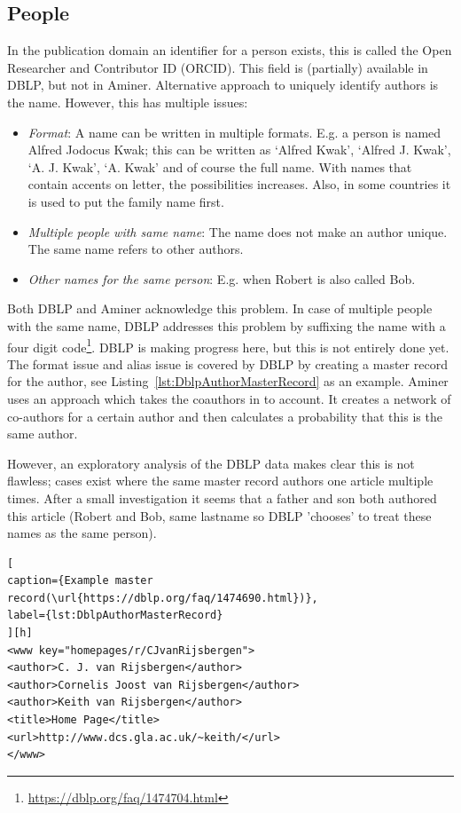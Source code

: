 \documentclass{ou-report}
\newcommand{\dblp}{DBLP}
\newcommand{\orcid}{ORCID}
\begin{document}
\subsection{People}
\label{sec:integrability_people}
In the publication domain an identifier for a person exists, this is called
the Open Researcher and Contributor ID (\orcid{}). This field is (partially) 
available in \dblp{}, but not in Aminer.
Alternative approach to uniquely identify authors is the name. However, this has
multiple issues:
\begin{itemize}
    \item \emph{Format}: A name can be written in multiple formats. E.g. a person is 
    named Alfred Jodocus Kwak; this can be written as `Alfred Kwak', 
    `Alfred J. Kwak', `A. J. Kwak', `A. Kwak' and of course the full name. 
    With names that contain accents on letter, the possibilities increases.
    Also, in some countries it is used to put the family name first.
    \item \emph{Multiple people with same name}: The name does not make an author 
    unique. The same name refers to other authors. 
    \item \emph{Other names for the same person}: E.g. when Robert is also called Bob.
\end{itemize}

Both \dblp{} and Aminer acknowledge this problem. In case of multiple 
people with the same name, DBLP addresses this problem by suffixing the
name with a four digit code\footnote{\url{https://dblp.org/faq/1474704.html}}.
\dblp{} is making progress here, but this is not entirely done yet. 
The format issue and alias issue is covered by \dblp{} by creating a master 
record for the author, see Listing~\ref{lst:DblpAuthorMasterRecord} as an 
example.
Aminer uses an approach which takes the coauthors in to account. It creates
a network of co-authors for a certain author and then calculates a 
probability that this is the same author.

However, an exploratory analysis of the \dblp{} data makes clear this is not 
flawless; cases exist where the same master record authors one 
article multiple times. After a small investigation it seems that a father 
and son both authored this article (Robert and Bob, same lastname so \dblp{} 
'chooses' to treat these names as the same person).
\lstset{language=XML}
\begin{lstlisting}[
caption={Example master record(\url{https://dblp.org/faq/1474690.html})},
label={lst:DblpAuthorMasterRecord}
][h]
<www key="homepages/r/CJvanRijsbergen">
<author>C. J. van Rijsbergen</author>
<author>Cornelis Joost van Rijsbergen</author>
<author>Keith van Rijsbergen</author>
<title>Home Page</title>
<url>http://www.dcs.gla.ac.uk/~keith/</url>
</www>
\end{lstlisting}
\end{document}
